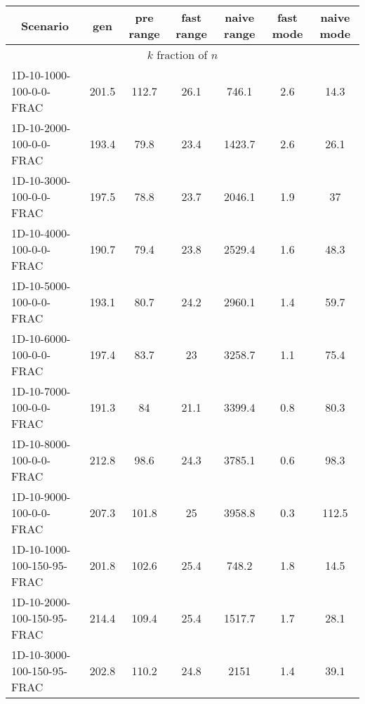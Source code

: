 \documentclass{article}
\begin{document}
    \begin{table}[h]
        \hskip0.8cm
        \begin{center}
        \begin{tabular}{|l||c|c|c|c|c|c|}
            \hline
            \multicolumn{1}{|c|}{Scenario} & gen   & pre range & fast range & naive range & fast mode & naive mode \\
            \hline
            \hline
            \multicolumn{7}{|c|}{$k$ fraction of $n$}                                                               \\
            \hline
            1D-10-1000-100-0-0-FRAC                     & 201.5 & 112.7      & 26.1       & 746.1       & 2.6       & 14.3       \\
            1D-10-2000-100-0-0-FRAC                     & 193.4 & 79.8       & 23.4       & 1423.7      & 2.6       & 26.1       \\
            1D-10-3000-100-0-0-FRAC                     & 197.5 & 78.8       & 23.7       & 2046.1      & 1.9       & 37         \\
            1D-10-4000-100-0-0-FRAC                     & 190.7 & 79.4       & 23.8       & 2529.4      & 1.6       & 48.3       \\
            1D-10-5000-100-0-0-FRAC                     & 193.1 & 80.7       & 24.2       & 2960.1      & 1.4       & 59.7       \\
            1D-10-6000-100-0-0-FRAC                     & 197.4 & 83.7       & 23         & 3258.7      & 1.1       & 75.4       \\
            1D-10-7000-100-0-0-FRAC                     & 191.3 & 84         & 21.1       & 3399.4      & 0.8       & 80.3       \\
            1D-10-8000-100-0-0-FRAC                     & 212.8 & 98.6       & 24.3       & 3785.1      & 0.6       & 98.3       \\
            1D-10-9000-100-0-0-FRAC                     & 207.3 & 101.8      & 25         & 3958.8      & 0.3       & 112.5      \\
            \hline
            1D-10-1000-100-150-95-FRAC                     & 201.8 & 102.6      & 25.4       & 748.2       & 1.8       & 14.5       \\
            1D-10-2000-100-150-95-FRAC                     & 214.4 & 109.4      & 25.4       & 1517.7      & 1.7       & 28.1       \\
            1D-10-3000-100-150-95-FRAC                     & 202.8 & 110.2      & 24.8       & 2151        & 1.4       & 39.1       \\

\end{tabular}
\end{center}
\end{table}
\end{document}

